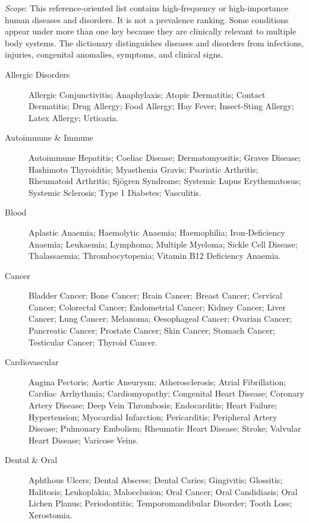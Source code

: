 \small
\noindent\textit{Scope}: This reference-oriented list contains high-frequency or high-importance human diseases and disorders. It is not a prevalence ranking. Some conditions appear under more than one key because they are clinically relevant to multiple body systems. The dictionary distinguishes diseases and disorders from infections, injuries, congenital anomalies, symptoms, and clinical signs.

\medskip
\begin{description}
\item[Allergic Disorders] Allergic Conjunctivitis; Anaphylaxis; Atopic Dermatitis; Contact Dermatitis; Drug Allergy; Food Allergy; Hay Fever; Insect-Sting Allergy; Latex Allergy; Urticaria.

\item[Autoimmune \& Immune] Autoimmune Hepatitis; Coeliac Disease; Dermatomyositis; Graves Disease; Hashimoto Thyroiditis; Myasthenia Gravis; Psoriatic Arthritis; Rheumatoid Arthritis; Sjögren Syndrome; Systemic Lupus Erythematosus; Systemic Sclerosis; Type 1 Diabetes; Vasculitis.

\item[Blood] Aplastic Anaemia; Haemolytic Anaemia; Haemophilia; Iron-Deficiency Anaemia; Leukaemia; Lymphoma; Multiple Myeloma; Sickle Cell Disease; Thalassaemia; Thrombocytopenia; Vitamin B12 Deficiency Anaemia.

\item[Cancer] Bladder Cancer; Bone Cancer; Brain Cancer; Breast Cancer; Cervical Cancer; Colorectal Cancer; Endometrial Cancer; Kidney Cancer; Liver Cancer; Lung Cancer; Melanoma; Oesophageal Cancer; Ovarian Cancer; Pancreatic Cancer; Prostate Cancer; Skin Cancer; Stomach Cancer; Testicular Cancer; Thyroid Cancer.

\item[Cardiovascular] Angina Pectoris; Aortic Aneurysm; Atherosclerosis; Atrial Fibrillation; Cardiac Arrhythmia; Cardiomyopathy; Congenital Heart Disease; Coronary Artery Disease; Deep Vein Thrombosis; Endocarditis; Heart Failure; Hypertension; Myocardial Infarction; Pericarditis; Peripheral Artery Disease; Pulmonary Embolism; Rheumatic Heart Disease; Stroke; Valvular Heart Disease; Varicose Veins.

\item[Dental \& Oral] Aphthous Ulcers; Dental Abscess; Dental Caries; Gingivitis; Glossitis; Halitosis; Leukoplakia; Malocclusion; Oral Cancer; Oral Candidiasis; Oral Lichen Planus; Periodontitis; Temporomandibular Disorder; Tooth Loss; Xerostomia.


\end{description}
